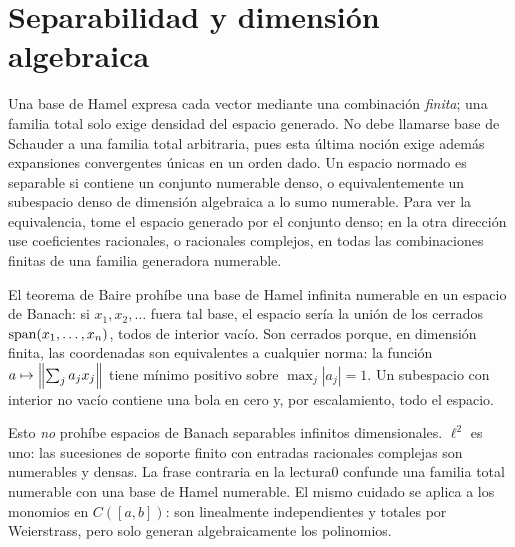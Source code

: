 \section{Separabilidad y dimensión algebraica}
Una base de Hamel expresa cada vector mediante una combinación \emph{finita}; una familia total solo exige densidad del espacio generado. No debe llamarse base de Schauder a una familia total arbitraria, pues esta última noción exige además expansiones convergentes únicas en un orden dado. Un espacio normado es separable si contiene un conjunto numerable denso, o equivalentemente un subespacio denso de dimensión algebraica a lo sumo numerable. Para ver la equivalencia, tome el espacio generado por el conjunto denso; en la otra dirección use coeficientes racionales, o racionales complejos, en todas las combinaciones finitas de una familia generadora numerable.

El teorema de Baire prohíbe una base de Hamel infinita numerable en un espacio de Banach: si $x_1,x_2,\ldots$ fuera tal base, el espacio sería la unión de los cerrados $\operatorname{span}(x_1,\ldots,x_n)$, todos de interior vacío. Son cerrados porque, en dimensión finita, las coordenadas son equivalentes a cualquier norma: la función $a\mapsto\left\lVert\sum_ja_jx_j\right\rVert$ tiene mínimo positivo sobre $\max_j|a_j|=1$. Un subespacio con interior no vacío contiene una bola en cero y, por escalamiento, todo el espacio.

Esto \emph{no} prohíbe espacios de Banach separables infinitos dimensionales. $\ell^2$ es uno: las sucesiones de soporte finito con entradas racionales complejas son numerables y densas. La frase contraria en la lectura0 confunde una familia total numerable con una base de Hamel numerable. El mismo cuidado se aplica a los monomios en $C([a,b])$: son linealmente independientes y totales por Weierstrass, pero solo generan algebraicamente los polinomios.

